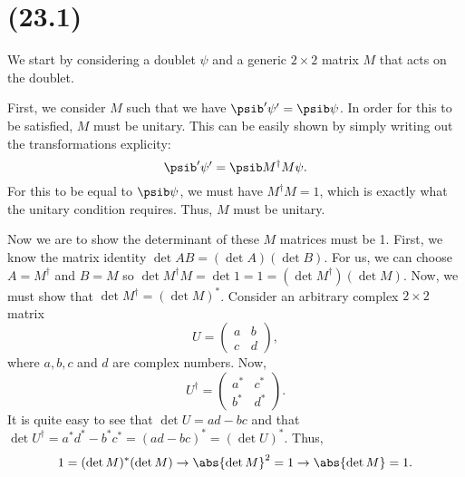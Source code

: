 \section{(23.1)}


We start by considering a doublet $\psi$ and a generic $2\times2$ matrix $M$ that acts on the doublet.


\begin{parts}


\item First, we consider $M$ such that we have $\psib'\psi' = \psib\psi$. In order for this to be satisfied, $M$ must be unitary. This can be easily shown by simply writing out the transformations explicity:
    \begin{equation}
        \psib'\psi' = \psib M^{\dagger}M \psi.
    \end{equation}
    For this to be equal to $\psib\psi$, we must have $M^{\dagger}M = 1$, which is exactly what the unitary condition requires. Thus, $M$ must be unitary.



\item Now we are to show the determinant of these $M$ matrices must be 1. First, we know the matrix identity $\det{AB} = (\det{A})(\det{B})$. For us, we can choose $A=M^{\dagger}$ and $B=M$ so $\det{M^{\dagger}M} = \det{1} = 1 = (\det{M^{\dagger}})(\det{M})$. Now, we must show that $\det{M^{\dagger}} = (\det{M})^*$. Consider an arbitrary complex $2\times2$ matrix
    \begin{equation}
        U = \begin{pmatrix}a & b \\ c & d\end{pmatrix},
    \end{equation}
    where $a,b,c$ and $d$ are complex numbers. Now,
    \begin{equation}
        U^{\dagger} = \begin{pmatrix}a^* & c^* \\ b^* & d^*\end{pmatrix}.
    \end{equation}
    It is quite easy to see that $\det{U} = ad - bc$ and that $\det{U^{\dagger}} = a^*d^* - b^*c^* = (ad - bc)^* = (\det{U})^*$. Thus,
    \begin{equation}
        1 = (\det{M})^*(\det{M}) \rightarrow \abs{\det{M}}^2 = 1 \rightarrow \abs{\det{M}} = 1.
    \end{equation}
    




\end{parts}
